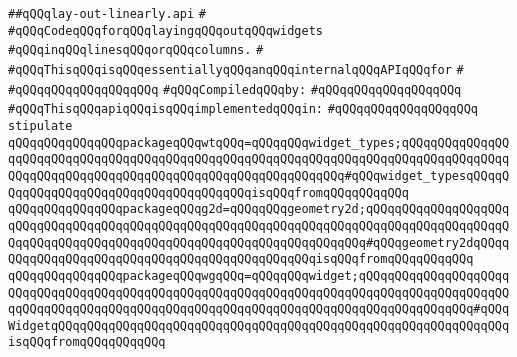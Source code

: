 \label{src/lib/x-kit/widget/old/layout/lay-out-linearly.api}
\verb|##qQQqlay-out-linearly.api|\newline
\verb|#|\newline
\verb|#qQQqCodeqQQqforqQQqlayingqQQqoutqQQqwidgets|\newline
\verb|#qQQqinqQQqlinesqQQqorqQQqcolumns.|\newline
\verb|#|\newline
\verb|#qQQqThisqQQqisqQQqessentiallyqQQqanqQQqinternalqQQqAPIqQQqfor|\newline
\verb|#|\newline
\verb|#qQQqqQQqqQQqqQQqqQQq|\newline
\newline
\verb|#qQQqCompiledqQQqby:|\newline
\verb|#qQQqqQQqqQQqqQQqqQQq|\newline
\newline
\verb|#qQQqThisqQQqapiqQQqisqQQqimplementedqQQqin:|\newline
\verb|#qQQqqQQqqQQqqQQqqQQq|\newline
\newline
\verb|stipulate|\newline
\verb|qQQqqQQqqQQqqQQqpackageqQQqwtqQQq=qQQqqQQqwidget_types;qQQqqQQqqQQqqQQqqQQqqQQqqQQqqQQqqQQqqQQqqQQqqQQqqQQqqQQqqQQqqQQqqQQqqQQqqQQqqQQqqQQqqQQqqQQqqQQqqQQqqQQqqQQqqQQqqQQqqQQqqQQqqQQqqQQq#qQQqwidget_typesqQQqqQQqqQQqqQQqqQQqqQQqqQQqqQQqqQQqqQQqisqQQqfromqQQqqQQqqQQq|\newline
\verb|qQQqqQQqqQQqqQQqpackageqQQqg2d=qQQqqQQqgeometry2d;qQQqqQQqqQQqqQQqqQQqqQQqqQQqqQQqqQQqqQQqqQQqqQQqqQQqqQQqqQQqqQQqqQQqqQQqqQQqqQQqqQQqqQQqqQQqqQQqqQQqqQQqqQQqqQQqqQQqqQQqqQQqqQQqqQQqqQQqqQQq#qQQqgeometry2dqQQqqQQqqQQqqQQqqQQqqQQqqQQqqQQqqQQqqQQqqQQqqQQqisqQQqfromqQQqqQQqqQQq|\newline
\verb|qQQqqQQqqQQqqQQqpackageqQQqwgqQQq=qQQqqQQqwidget;qQQqqQQqqQQqqQQqqQQqqQQqqQQqqQQqqQQqqQQqqQQqqQQqqQQqqQQqqQQqqQQqqQQqqQQqqQQqqQQqqQQqqQQqqQQqqQQqqQQqqQQqqQQqqQQqqQQqqQQqqQQqqQQqqQQqqQQqqQQqqQQqqQQqqQQqqQQq#qQQqWidgetqQQqqQQqqQQqqQQqqQQqqQQqqQQqqQQqqQQqqQQqqQQqqQQqqQQqqQQqqQQqqQQqisqQQqfromqQQqqQQqqQQq|\newline

